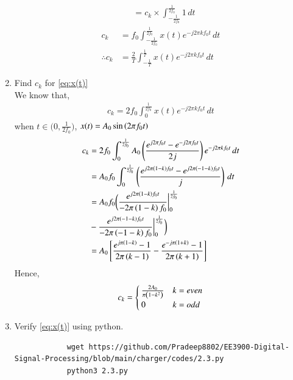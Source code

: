 \documentclass[journal,12pt,twocolumn]{IEEEtran}
\renewcommand\thesection{\arabic{section}}
\begin{document}
\begin{enumerate}[label=\thesection.\arabic*,ref=\thesection.\theenumi]
\begin{align}
			&=c_k \times \int_{-\frac{1}{2f_0}}^{\frac{1}{2f_0}}1\,dt
		\end{align}
		\begin{align}
			c_k &= f_0\int_{-\frac{1}{2f_0}}^{\frac{1}{2f_0}}x(t)e^{-j2\pi kf_0 t}\, dt\\
			\therefore c_k &= \frac{2}{T} \int_{-\frac{1}{T}}^{\frac{1}{T}}x(t)e^{-j2\pi kf_0 t}\, dt
		\end{align}
		\item Find $c_k$ for 
		\eqref{eq:x(t)}\\
		\solution
		We know that,
		\begin{align}
			c_k = 2f_0\int_{0}^{\frac{1}{2f_0}}x(t)e^{- j2 \pi kf_0 t}\, dt
		\end{align}
		when $t \in \bigg( 0,\frac{1}{2f_0}\bigg)$, $x(t)=A_0 \sin\left(2 \pi f_0t\right)$\\
		\begin{align}
			c_k &= 2f_0\int_{0}^{\frac{1}{2f_0}}A_0 \left(\frac{e^{j2\pi f_0t}-e^{-j 2\pi f_0t}}{2j}\right) e^{- j2 \pi kf_0 t}\,dt\\
			&=A_0f_0\int_{0}^{\frac{1}{2f_0}} \left(\frac{e^{j2\pi\left(1-k\right) f_0t}-e^{j 2\pi\left(-1-k\right) f_0t}}{j}\right)\,dt\\
			&=A_0f_0\bigg(\frac{e^{j2\pi\left(1-k\right) f_0t}}{-2\pi \left(1-k\right)f_0}\bigg|_0^{\frac{1}{2f_0}} \\&- \frac{e^{j2\pi\left(-1-k\right) f_0t}}{-2\pi \left(-1-k\right)f_0}\bigg|_0^{\frac{1}{2f_0}}\bigg)\\
			&=A_0{}\left[\frac{e^{j\pi\left(1-k\right)}-1}{2\pi\left(k-1\right)}-\frac{e^{-j\pi\left(1+k\right)}-1}{2\pi\left(k+1\right)}\right]
		\end{align}
		Hence,
		\begin{equation}
			\label{eq:ck}
			c_k= \begin{cases}
				\frac{2A_0}{\pi\left(1-k^2\right)}&k=even
				\\
				0&k=odd
			\end{cases}
		\end{equation}
		\item Verify 
		\eqref{eq:x(t)}
		using python.\\
		\solution 
		\begin{lstlisting}
			wget https://github.com/Pradeep8802/EE3900-Digital-Signal-Processing/blob/main/charger/codes/2.3.py
			python3 2.3.py
		\end{lstlisting}
		\begin{figure}[!ht]
			\centering

\end{figure}
\end{enumerate}
\end{document}
